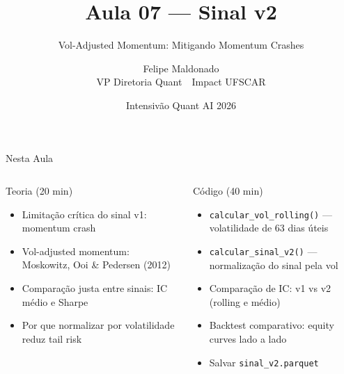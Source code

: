 \documentclass[aspectratio=169,12pt]{beamer}
\author{Felipe Maldonado\\{\scriptsize VP Diretoria Quant~\textbullet{}~Impact UFSCAR}}
\date{Intensivão Quant AI 2026}
\title{Aula 07 --- Sinal v2}
\subtitle{Vol-Adjusted Momentum: Mitigando Momentum Crashes}
\begin{document}
\begin{frame}[plain]
\titlepage
\end{frame}

\begin{frame}[fragile]{Nesta Aula}
\begin{columns}[T]
\begin{block}{Teoria (20 min)}
\begin{itemize}
  \item Limitação crítica do sinal v1: momentum crash
  \item Vol-adjusted momentum: Moskowitz, Ooi \& Pedersen (2012)
  \item Comparação justa entre sinais: IC médio e Sharpe
  \item Por que normalizar por volatilidade reduz tail risk
\end{itemize}
\end{block}
\begin{block}{Código (40 min)}
\begin{itemize}
  \item \texttt{calcular\_vol\_rolling()} — volatilidade de 63 dias úteis
  \item \texttt{calcular\_sinal\_v2()} — normalização do sinal pela vol
  \item Comparação de IC: v1 vs v2 (rolling e médio)
  \item Backtest comparativo: equity curves lado a lado
  \item Salvar \texttt{sinal\_v2.parquet}
\end{itemize}
\end{block}
\end{columns}
\end{frame}
\end{document}
